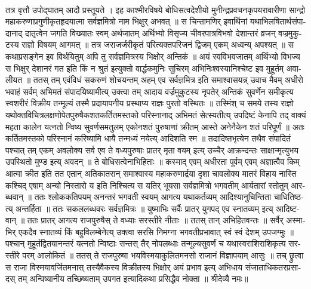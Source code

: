 \documentclass[a4paper, 11pt, oneside, french]{article}
\begin{document}
\paragraph{}
\texthindi{तत्र वृत्तौ उपोद्घातम् आदौ प्रस्तूयते । इह काश्मीरविषये बोधिसत्वदेशीयो मुनीन्द्रप्रवचनकृपयरावारीणा सान्द्रो महाकरुणाप्रगुणीकृतहृदयात्मा सर्वज्ञमित्रो नाम भिक्षुर् अभवत् ॥ स चिन्तामणिर् इवार्थिनां यथाभिलषितार्थसंपादानाद् दातृत्वेन जगति विख्यातः स्वम् अर्थजातम् अर्थिभ्यो विसृज्य चीवरपात्रविभवो देशान्तरं व्रजन् वज्रमुकुटस्य राज्ञो विषयम् आगमत् ॥ तत्र जराजर्जरीकृतं परित्यक्तपरिजनं द्विजम् एकम् अध्वन्य् अपश्यत् ॥ स कथाप्रसङ्गेन इव विर्थयितुम् अपि तु सर्वज्ञमित्रस्य भिक्षोर् अन्तिकं ॥ अयं स्वविभवजातम् अर्थिभ्यो विभज्य स भिक्षुर् देशानरं गत इति किं न श्रुतं इत्युक्तो वार्द्धकमुनिः सुचिरम् अभिनिःश्वस्यानिश्चेष्ट इव मुहूर्तम् अवालीयत ॥ ततस् तम् एवंविधं सकरुणं शोचयन्तम् अहम् एव सर्वज्ञमित्र इति समाश्वासयन्न् उवाच मैवम् अधीरो भवाहं सर्वम् अभिमतं संपादयिष्यामीत्य् उक्त्वा तम् आदाय वर्ज्रमुकुटस्य नृपतेर् अन्तिकं सुवर्णेन समीकृत्य स्वशरीरं विक्रीय तन्मूल्यं तस्मै प्रदायापनीय प्रस्थाप्य राज्ञः पुरतो वस्थितः ॥ तस्मिंश् च समये तस्य राज्ञो यथोक्तविचित्रलक्षणोपेतपुरुषैकशतकर्तितमस्तको परिस्नानाद् अभिमतं सेत्स्यतीत्य् उपदिष्टं केनापि तद् वाक्यं महता कालेन यत्नतो न्विष्य सुवर्णसमतुलम् एकोनशतं पुरुषाणां क्रीतम् आस्ते अनेनैकेन शतं परिपूर्णं ॥ अतः कर्तितमस्तको परिस्नानं करिष्यामि धायै तन्मध्यं नयेत्य् आदिशति स्म ॥ तदादिष्तभृत्येन तथैव संपादितं पश्चात् तम् एकम् अवलोक्य सर्व एव ते वध्यपुरुषाः प्रातर् मृता वयम् इत्य् उच्चैर् आक्रन्दन्तः साक्षान्मृत्युभय उपस्थितो मुण्ड इत्य् अवदन् ॥ ते बोधिसत्वेनाभिहिताः ॥ कस्माद् एवम् अधीरता पूर्वम् एवम् अज्ञात्वैव किम् आत्मा क्रीत इति तत एतान् अतिकातरान् समाश्वास्य महाकरुणार्द्रया दृशा चावलोक्य मातरं विहाय नास्ति कश्चिद् एषाम् अन्यो निस्तारो य इति निश्चित्य स यतिर् भूयसा सर्वज्ञमित्रो भगवतीम् आर्यतारां स्तोतुम् आरब्धवान् ॥ ततः श्लोककतिपयम् अनन्तरं भगवती स्वयम् आगत्य यथाकर्तव्यम् आदिश्यानुचिन्तिता चाधितिष्ठत्य् अन्तर्हिता ॥ ततः सकललब्धवरः सर्वज्ञमित्रः ॥ युष्माभिः सर्वैः प्रातर् युगपद् एव स्नातव्यम् इत्य् आदिष्टवान् ॥ ततः प्रातर् आगत्य राजपुरुषैस् ते वध्याः सरस्तीरे नीताः ॥ ततस् तान् अभिहितवन्तः ॥ सर्वैर् अस्माभिर् एकदैव स्नातव्यं किं बहुविलम्बेनेत्य् उक्त्वा सरसि निमग्ना भगवतीप्रभावात् स्वं स्वं देशम् उपजग्मुः ॥ पश्चान् मुहूर्तद्वितयानन्तरं यत्नतो न्विष्टाः सन्तस् तैर् नोपलब्धाः तन्मूल्यसुवर्णं च यथास्वराशिराशिकृत्य सरस्तीरे परम् आलोकितं ॥ ततस् ते राजपुरुषा भयविस्मयाकुलितमनसो राजानं विज्ञापयाम् आसुः ॥ तच् छ्रुत्वा स राजा विस्मयावर्जितमनास् तस्यैवैकस्य विक्रीतस्य भिक्षोर् अयं प्रभाव इत्य् अभिधाय संजाताधिकतरप्रसादस् तम् अन्विष्यानीय तच्छिष्यताम् उपगत इत्यादिकथा प्रसिद्धैव नोक्ता ॥ श्रीदेव्यै नमः॥}
\clearpage
\end{document}
